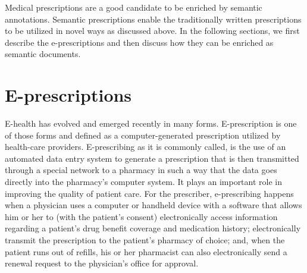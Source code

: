 \documentclass[conference]{IEEEtran}
\begin{document}
Medical prescriptions are a good candidate to be enriched by semantic annotations.
Semantic prescriptions enable the traditionally written prescriptions to be utilized in novel ways as discussed above.
In the following sections, we first describe the e-prescriptions and then discuss how they can be enriched as semantic documents.

\section{E-prescriptions}
\label{sec:epresc}

E-health has evolved and emerged recently in many forms.
E-prescription is one of those forms and defined as a computer-generated prescription utilized by health-care providers.
E-prescribing as it is commonly called, is the use of an automated data entry system to generate a prescription that is then transmitted through a special network to a pharmacy in such a way that the data goes directly into the pharmacy’s computer system.
It plays an important role in improving the quality of patient care.
For the prescriber, e-prescribing happens when a physician uses a computer or handheld device with a software that allows him or her to (with the patient’s consent) electronically access information regarding a patient’s drug benefit coverage and medication history; electronically transmit the prescription to the patient’s pharmacy of choice; and, when the patient runs out of refills, his or her pharmacist can also electronically send a renewal request to the physician’s office for approval.

\end{document}
